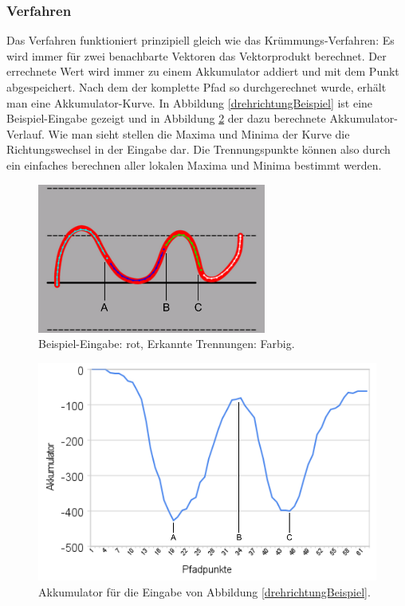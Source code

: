\subsubsection{Verfahren}
Das Verfahren funktioniert prinzipiell gleich wie das Krümmungs-Verfahren: Es wird immer für zwei benachbarte Vektoren das Vektorprodukt berechnet. Der errechnete Wert wird immer zu einem Akkumulator addiert und mit dem Punkt abgespeichert. Nach dem der komplette Pfad so durchgerechnet wurde, erhält man eine Akkumulator-Kurve. In Abbildung \ref{drehrichtungBeispiel} ist eine Beispiel-Eingabe gezeigt und in Abbildung \ref{akkumulatorDiagramm} der dazu berechnete Akkumulator-Verlauf. Wie man sieht stellen die Maxima und Minima der Kurve die Richtungswechsel in der Eingabe dar. Die Trennungspunkte können also durch ein einfaches berechnen aller lokalen Maxima und Minima bestimmt werden.

\begin{figure}[h!]
  \centering
    \includegraphics[width=0.67\textwidth]{./img/akkumulator_beispiel.pdf}
  \caption{Beispiel-Eingabe: rot, Erkannte Trennungen: Farbig.}
  \label{drehrichtungsBeispiel}
\end{figure}

\begin{figure}[h!]
  \centering
    \includegraphics[width=1.0\textwidth]{./img/akkumulator_diagramm.pdf}
  \caption{Akkumulator für die Eingabe von Abbildung \ref{drehrichtungBeispiel}.}
  \label{akkumulatorDiagramm}
\end{figure}


